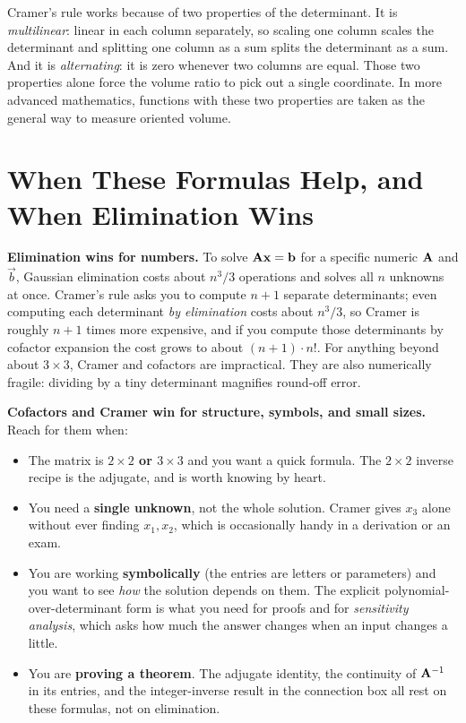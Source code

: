 \begin{aestheticbox}
Cramer's rule works because of two properties of the determinant. It is \emph{multilinear}: linear
in each column separately, so scaling one column scales the determinant and splitting one column as
a sum splits the determinant as a sum. And it is \emph{alternating}: it is zero whenever two
columns are equal. Those two properties alone force the volume ratio to pick out a single
coordinate. In more advanced mathematics, functions with these two properties are taken as the
general way to measure oriented volume.
\end{aestheticbox}

\section{When These Formulas Help, and When Elimination Wins}\label{ch22:sec-when}

\textbf{Elimination wins for numbers.} To solve $\mathbf{A}\mathbf{x}=\mathbf{b}$ for a specific numeric $\mathbf{A}$
and $\vec b$, Gaussian elimination costs about $n^3/3$ operations and solves all $n$ unknowns at once.
Cramer's rule asks you to compute $n+1$ separate determinants; even computing each determinant
\emph{by elimination} costs about $n^3/3$, so Cramer is roughly $n+1$ times more expensive, and if
you compute those determinants by cofactor expansion the cost grows to about $(n+1)\cdot n!$. For
anything beyond about $3\times3$, Cramer and cofactors are impractical. They are also
numerically fragile: dividing by a tiny determinant magnifies round-off error.

\textbf{Cofactors and Cramer win for structure, symbols, and small sizes.} Reach for them when:
\begin{itemize}
\item The matrix is \textbf{$2\times2$ or $3\times3$} and you want a quick formula. The $2\times
  2$ inverse recipe is the adjugate, and is worth knowing by heart.
\item You need a \textbf{single unknown}, not the whole solution. Cramer gives $x_3$ alone without
  ever finding $x_1,x_2$, which is occasionally handy in a derivation or an exam.
\item You are working \textbf{symbolically} (the entries are letters or parameters) and you want
  to see \emph{how} the solution depends on them. The explicit polynomial-over-determinant form is
  what you need for proofs and for \emph{sensitivity analysis}, which asks how much the answer
  changes when an input changes a little.
\item You are \textbf{proving a theorem}. The adjugate identity, the continuity of $\mathbf{A}^{-1}$ in its
  entries, and the integer-inverse result in the connection box all rest on these formulas, not on
  elimination.
\end{itemize}

